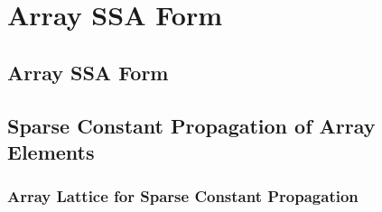 \chapter{Array SSA Form }
\label{chapter:array_ssa}
{}

\label{sec:intro}

\section{Array SSA Form}
\label{sec:arrayssa}

\section{Sparse Constant Propagation of Array Elements}\label{sec:cp}
\subsection{Array Lattice for Sparse Constant Propagation }
\label{sec:arraylattice}


